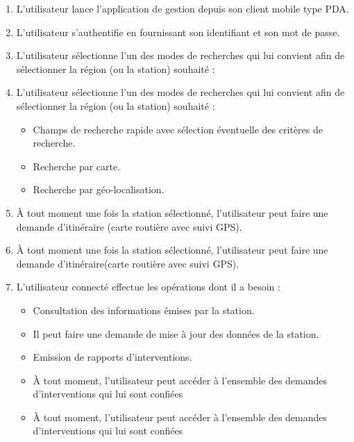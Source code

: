\begin{enumerate}
\item L'utilisateur lance l'application de gestion depuis son client mobile type PDA.
\item L'utilisateur s'authentifie en fournissant son identifiant et son mot de passe.

\item L'utilisateur sélectionne l'un des modes de recherches qui lui convient afin de sélectionner
 la région (ou la station) souhaité :

\item L'utilisateur sélectionne l'un des modes de recherches qui lui convient afin de sélectionner la région (ou la station) souhaité :

	\begin{itemize}
	\item Champs de recherche rapide avec sélection éventuelle des critères de recherche.

	\item Recherche par carte.

	\item Recherche par géo-localisation.
	
	\end{itemize}


	\item À tout moment une fois la station sélectionné, l'utilisateur peut faire une demande 
	d'itinéraire (carte routière avec suivi GPS).

	\item À tout moment une fois la station sélectionné, l'utilisateur peut faire une demande d'itinéraire(carte routière avec suivi GPS).

	\item L'utilisateur connecté effectue les opérations dont il a besoin :
	
	\begin{itemize}
	\item Consultation des informations émises par la station. 
	\item Il peut faire une demande de mise à jour des données de la station.
	\item Emission de rapports d'interventions.

    \item À tout moment, l'utilisateur peut accéder à l'ensemble des demandes d'interventions 
    qui lui sont confiées

    \item À tout moment, l'utilisateur peut accéder à l'ensemble des demandes d'interventions qui lui sont confiées

	\end{itemize}
\end{enumerate}


